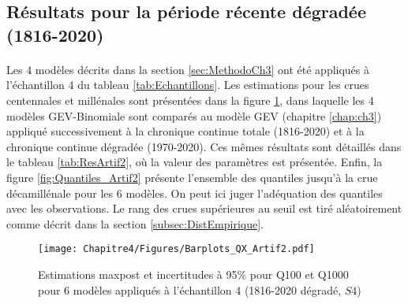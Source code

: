 	\FloatBarrier	
	
	\subsection{Résultats pour la période récente dégradée (1816-2020)}
	\label{subsec:ResultsArtif}
	
	\paragraph{} 
	Les 4 modèles décrits dans la section \ref{sec:MethodoCh3} ont été appliqués à l'échantillon 4 du tableau \ref{tab:Echantillons}. Les estimations pour les crues centennales et millénales sont présentées dans la figure \ref{fig:Barplot_Artif2}, dans laquelle les 4 modèles GEV-Binomiale sont comparés au modèle GEV (chapitre \ref{chap:ch3}) appliqué successivement à la chronique continue totale (1816-2020) et à la chronique continue dégradée (1970-2020). Ces mêmes résultats sont détaillés dans le tableau \ref{tab:ResArtif2}, où la valeur des paramètres est présentée. Enfin, la figure \ref{fig:Quantiles_Artif2} présente l'ensemble des quantiles jusqu'à la crue décamillénale pour les 6 modèles. On peut ici juger l'adéquation des quantiles avec les observations. Le rang des crues supérieures au seuil est tiré aléatoirement comme décrit dans la section \ref{subsec:DistEmpirique}. 	
	
	\begin{figure}[h]
		\centering
		\texttt{[image: Chapitre4/Figures/Barplots\_QX\_Artif2.pdf]}	
		\caption{Estimations maxpost et incertitudes à 95\% pour Q100 et Q1000 pour 6 modèles appliqués à l'échantillon 4 (1816-2020 dégradé, $S4$)}
		\label{fig:Barplot_Artif2}
	\end{figure}

